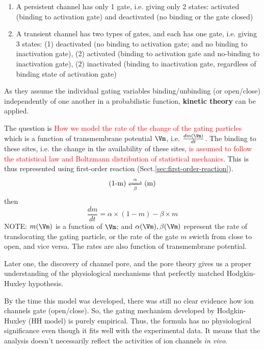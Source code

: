 \begin{enumerate}
  \item A persistent channel has only 1 gate, i.e. giving only 2 states:
  activated (binding to activation gate) and deactivated (no binding or the
  gate closed)
  
  
  \item A transient channel has two types of gates, and each has one gate, i.e.
  giving 3 states: (1) deactivated (no binding to activation gate; and
  no binding to inactivation gate), (2) activated (binding to activation gate
  and no-binding to inactivation gate), (2) inactivated (binding to inactivation
  gate, regardless of binding state of activation gate)
\end{enumerate}
As they assume the individual gating variables
binding/unbinding (or open/close) independently of one another in a
probabilistic function, {\bf kinetic theory} can be applied.


The question is \textcolor{red}{How we model the rate of the change of the
gating particles} which is a function of transmembrane potential $\Vm$, i.e.
$\frac{dm(\Vm)}{dt}$. The binding to these sites, i.e. the change in the
availability of these sites, \textcolor{red}{is assumed to follow the
statistical law and Boltzmann distribution of statistical mechanics}. 
This is thus represented using first-order reaction
(Sect.\ref{sec:first-order-reaction}).
\begin{equation}
\ce{ (1-m) <=>[\alpha][\beta](m)}
\end{equation}
then 
\begin{equation}
\frac{dm}{dt} = \alpha \times (1-m) - \beta \times m
\end{equation}
NOTE: $m(\Vm)$ is a function of $\Vm$; and
$\alpha(\Vm), \beta(\Vm)$ represent the rate of translocating the gating
particle, or the rate of the gate $m$ swicth from close to open, and vice versa.
The rates are also function of transmembrane potential.

Later one,
the discovery of channel pore, and the pore theory gives us a proper
understanding of the physiological mechanisms that perfectly matched
Hodgkin-Huxley hypothesis.



\begin{mdframed}
  By the time this model was developed, there was still no clear
  evidence how ion channels gate (open/close). So, the gating mechanism
  developed by Hodgkin-Huxley (HH model) is purely empirical. Thus, the
  formula has no physiological significance even though it fits well
  with the experimental data.  It means that the analysis doesn't
  necessarily reflect the activities of ion channels {\it in vivo}.
\end{mdframed}


